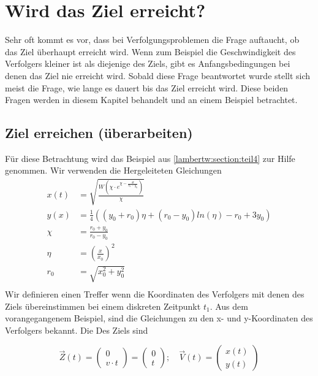 %
%
%
\section{Wird das Ziel erreicht?
\label{lambertw:section:teil1}}

Sehr oft kommt es vor, dass bei Verfolgungsproblemen die Frage auftaucht, ob das Ziel überhaupt erreicht wird.
Wenn zum Beispiel die Geschwindigkeit des Verfolgers kleiner ist als diejenige des Ziels, gibt es Anfangsbedingungen bei denen das Ziel nie erreicht wird.
Sobald diese Frage beantwortet wurde stellt sich meist die Frage, wie lange es dauert bis das Ziel erreicht wird.
Diese beiden Fragen werden in diesem Kapitel behandelt und an einem Beispiel betrachtet.

\subsection{Ziel erreichen (überarbeiten)
\label{lambertw:subsection:ZielErreichen}}
Für diese Betrachtung wird das Beispiel aus \eqref{lambertw:section:teil4} zur Hilfe genommen.
Wir verwenden die Hergeleiteten Gleichungen
\begin{align*}
    x\left(t\right)
    &=
    \sqrt{\frac{W\left(\chi\cdot e^{\chi-\frac{4t}{r_0-y_0}}\right)}{\chi}} \\
    y(x)
    &=
    \frac{1}{4}\left(\left(y_0+r_0\right)\eta+\left(r_0-y_0\right)ln\left(\eta\right)-r_0+3y_0\right) \\
    \chi
    &=
    \frac{r_0+y_0}{r_0-y_0}\\
    \eta
    &=
    \left(\frac{x}{x_0}\right)^2 
    \\
    r_0
    &=
    \sqrt{x_0^2+y_0^2} \\
\end{align*}
Wir definieren einen Treffer wenn die Koordinaten des Verfolgers mit denen des Ziels übereinstimmen bei einem diskreten Zeitpunkt $t_1$. Aus dem vorangegangenem Beispiel, sind die Gleichungen zu den x- und y-Koordinaten des Verfolgers bekannt. Die Des Ziels sind

\begin{equation}
    \vec{Z}(t)
    =
    \left( \begin{array}{c} 0 \\ v \cdot t \end{array} \right)
    =
    \left( \begin{array}{c} 0 \\ t \end{array} \right)
    ;\quad
    \vec{V}(t)
    =
    \left( \begin{array}{c} x(t) \\ y(t) \end{array} \right)
    \label{lambertw:Anfangspunkte}
\end{equation}

